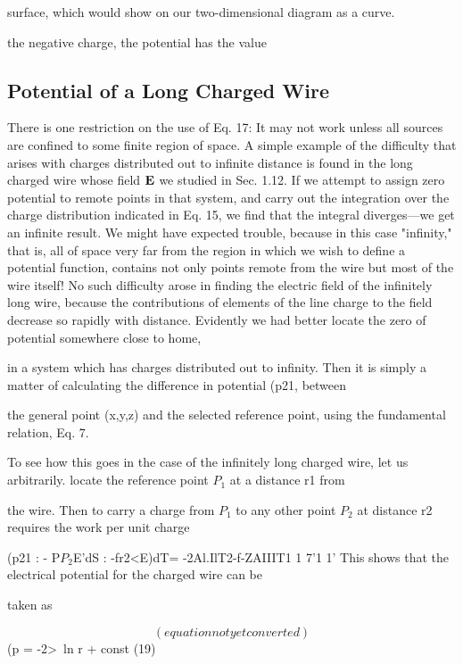 surface, which would show on our two-dimensional diagram as a
curve.

the negative charge, the potential has the value

\subsection{Potential of a Long Charged Wire}

There is one restriction on the
use of Eq. 17: It may not work unless all sources are confined to some
finite region of space. A simple example of the difficulty that arises
with charges distributed out to infinite distance is found in the long
charged wire whose field $\mathbf{E}$ we studied in Sec. 1.12. If we attempt to
assign zero potential to remote points in that system, and carry out
the integration over the charge distribution indicated in Eq. 15, we
find that the integral diverges---we get an infinite result. We might
have expected trouble, because in this case "infinity," that is, all of
space very far from the region in which we wish to define a potential
function, contains not only points remote from the wire but most of
the wire itself! No such difficulty arose in finding the electric field of
the infinitely long wire, because the contributions of elements of the
line charge to the field decrease so rapidly with distance. Evidently
we had better locate the zero of potential somewhere close to home,

in a system which has charges distributed out to infinity. Then it is
simply a matter of calculating the difference in potential (p21, between

the general point (x,y,z) and the selected reference point, using the
fundamental relation, Eq. 7.

To see how this goes in the case of the infinitely long charged wire,
let us arbitrarily. locate the reference point $P_1$ at a distance r1 from

the wire. Then to carry a charge from $P_1$ to any other point $P_2$ at
distance r2 requires the work per unit charge

(p21 : - P$P_2$E'dS : -fr2<E)dT= -2Al.IlT2-f-ZAIIIT1 
1 7'1 1'
This shows that the electrical potential for the charged wire can be

taken as

\begin{equation}
(equation not yet converted)
\end{equation}
(p = -2>\ ln r + const (19)


